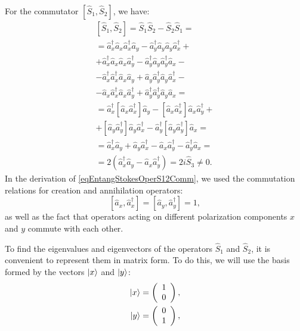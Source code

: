 For the commutator $\left[\hat{S}_1,\hat{S}_2\right]$, we have:
\begin{eqnarray}
\left[\hat{S}_1,\hat{S}_2\right] = \hat{S}_1\hat{S}_2 -
\hat{S}_2\hat{S}_1 = 
\nonumber \\
=
\hat{a}_x^{\dag}\hat{a}_x\hat{a}_x^{\dag}\hat{a}_y -
\hat{a}_y^{\dag}\hat{a}_y\hat{a}_y\hat{a}_x^{\dag} + 
\nonumber \\
+ \hat{a}_x^{\dag}\hat{a}_x\hat{a}_x\hat{a}_y^{\dag} -
\hat{a}_y^{\dag}\hat{a}_y\hat{a}_y^{\dag}\hat{a}_x -
\nonumber \\
- \hat{a}_x^{\dag}\hat{a}_x^{\dag}\hat{a}_x\hat{a}_y +
\hat{a}_y\hat{a}_y^{\dag}\hat{a}_y\hat{a}_x^{\dag} -
\nonumber \\
- \hat{a}_x\hat{a}_x^{\dag}\hat{a}_x\hat{a}_y^{\dag} +
\hat{a}_y^{\dag}\hat{a}_y^{\dag}\hat{a}_y\hat{a}_x =
\nonumber \\
= \hat{a}_x^{\dag}\left[\hat{a}_x\hat{a}_x^{\dag}\right]\hat{a}_y -
\left[\hat{a}_x\hat{a}_x^{\dag}\right]\hat{a}_x\hat{a}_y^{\dag} +
\nonumber \\
+\left[\hat{a}_y\hat{a}_y^{\dag}\right]\hat{a}_y\hat{a}_x^{\dag} -
\hat{a}_y^{\dag}\left[\hat{a}_y\hat{a}_y^{\dag}\right]\hat{a}_x =
\nonumber \\
= \hat{a}_x^{\dag}\hat{a}_y + \hat{a}_y\hat{a}_x^{\dag} -
\hat{a}_x\hat{a}_y^{\dag} - \hat{a}_y^{\dag}\hat{a}_x = 
\nonumber \\
= 2 \left(\hat{a}_x^{\dag}\hat{a}_y - \hat{a}_x\hat{a}_y^{\dag}\right) = 2 i
\hat{S}_3 \ne 0.
\label{eqEntangStokesOperS12Comm}
\end{eqnarray}
In the derivation of \eqref{eqEntangStokesOperS12Comm}, we used
the commutation relations for creation and annihilation operators:
\begin{equation}
\left[\hat{a}_x, \hat{a}^{\dag}_x\right] = \left[\hat{a}_y, \hat{a}^{\dag}_y\right] = 1,
\nonumber
\end{equation}
as well as the fact that operators acting on different polarization components
$x$ and $y$ commute with each other.

To find the eigenvalues and eigenvectors of the operators $\hat{S}_1$ and
$\hat{S}_2$, it is convenient to represent them in matrix form. To do this, we will
use the basis formed by the vectors $\ket{x}$ and
$\ket{y}$:
\begin{eqnarray}
\ket{x} = \left(
\begin{array}{c}
1 \\
0
\end{array}
\right),
\nonumber \\
\ket{y} = \left(
\begin{array}{c}
0 \\
1
\end{array}
\right),
\nonumber
\end{eqnarray}

